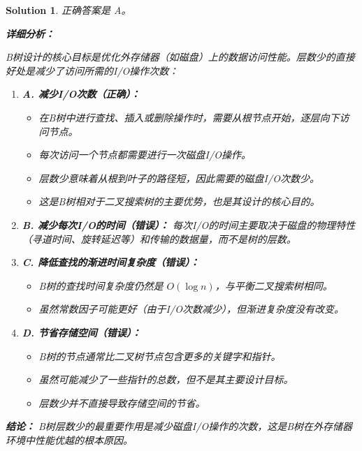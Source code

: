 \documentclass[UTF8]{report}
\newtheorem{solution}{Solution}
\theoremstyle{MyLineTheoremStyle} %
\theoremstyle{MyBlockTheoremStyle} %
\theoremstyle{MySubsubsectionStyle} %
\begin{document}
\begin{solution}
正确答案是 A。

\textbf{详细分析：}

B树设计的核心目标是优化外存储器（如磁盘）上的数据访问性能。层数少的直接好处是减少了访问所需的I/O操作次数：

\begin{enumerate}
    \item \textbf{A. 减少I/O次数（正确）：}
    \begin{itemize}
        \item 在B树中进行查找、插入或删除操作时，需要从根节点开始，逐层向下访问节点。
        \item 每次访问一个节点都需要进行一次磁盘I/O操作。
        \item 层数少意味着从根到叶子的路径短，因此需要的磁盘I/O次数少。
        \item 这是B树相对于二叉搜索树的主要优势，也是其设计的核心目的。
    \end{itemize}

    \item \textbf{B. 减少每次I/O的时间（错误）：}
    每次I/O的时间主要取决于磁盘的物理特性（寻道时间、旋转延迟等）和传输的数据量，而不是树的层数。

    \item \textbf{C. 降低查找的渐进时间复杂度（错误）：}
    \begin{itemize}
        \item B树的查找时间复杂度仍然是 $O(\log n)$，与平衡二叉搜索树相同。
        \item 虽然常数因子可能更好（由于I/O次数减少），但渐进复杂度没有改变。
    \end{itemize}

    \item \textbf{D. 节省存储空间（错误）：}
    \begin{itemize}
        \item B树的节点通常比二叉树节点包含更多的关键字和指针。
        \item 虽然可能减少了一些指针的总数，但不是其主要设计目标。
        \item 层数少并不直接导致存储空间的节省。
    \end{itemize}
\end{enumerate}

\textbf{结论：}
B树层数少的最重要作用是减少磁盘I/O操作的次数，这是B树在外存储器环境中性能优越的根本原因。
\end{solution}
\end{document}
